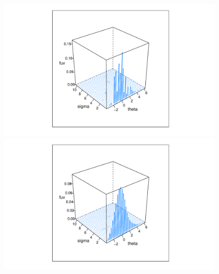 \documentclass[12pt]{article}
\begin{document}
\begin{figure}[h]
    \centering
    \begin{minipage}{0.5\textwidth}
        \centering
        \includegraphics[width=\textwidth]{../../Figures/2013-2022/GMM_m/GLVmix.pdf}
    \end{minipage}\hfill
    \begin{minipage}{0.5\textwidth}
        \centering
        \includegraphics[width=\textwidth]{../../Figures/2013-2022/GMM_m/GLVmix_s.pdf}
    \end{minipage}
\end{figure}
\end{document}
